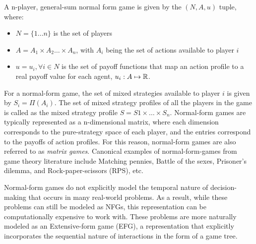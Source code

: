 \begin{definition} A n-player, general-sum normal form game is given by the $(N,
		A, u)$ tuple, where:
	\begin{itemize}
		\item $N = \{1 \dots n \}$ is the set of players
		\item $A =
			      A_1 \times A_2 \ldots \times A_n$, with $A_i$ being the set of actions available to player $i$
		\item $u = {u_i, \forall i \in N}$ is the set of payoff functions that map an action profile to a
		      real payoff value for each agent, $u_i: A \mapsto \mathbb{R}$.
	\end{itemize}
\end{definition}

For a normal-form game, the set of mixed strategies available to player $i$ is given by $S_i =
	\Pi(A_i)$.
The set of mixed strategy profiles of all the players in the game is called as the mixed strategy
profile $S = S1 \times \dots \times S_n$.
Normal-form games are typically represented as a n-dimensional matrix, where each dimension
corresponds to the pure-strategy space of each player, and the entries correspond to the payoffs of
action profiles.
For this reason, normal-form games are also referred to as \textit{matrix games}.
Canonical examples of normal-form-games from game theory literature include Matching pennies,
Battle of the sexes, Prisoner's dilemma, and Rock-paper-scissors (RPS), etc.

Normal-form games do not explicitly model the temporal nature of decision-making that occurs in
many real-world problems.
As a result, while these problems can still be modeled as NFGs, this representation can be
computationally expensive to work with.
These problems are more naturally modeled as an Extensive-form game (EFG), a representation that
explicitly incorporates the sequential nature of interactions in the form of a game tree.

